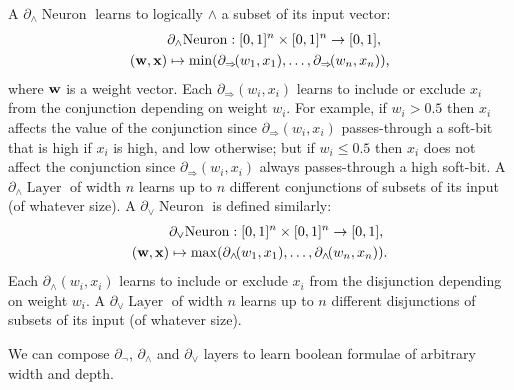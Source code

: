 \documentclass{article}
\theoremstyle{plain}
\theoremstyle{definition}
\theoremstyle{remark}
\begin{document}
A $\partial_{\wedge}\!\operatorname{Neuron}$ learns to logically $\wedge$ a subset of its input vector:
\begin{equation*}
\begin{aligned}
& \partial_{\wedge}\!\operatorname{Neuron}: [0,1]^{n} \times [0,1]^{n} \to [0,1], \\
({\bf w}, {\bf x}) & \mapsto \min(\partial_{\Rightarrow}\!(w_{1}, x_{1}), \dots, \partial_{\Rightarrow}\!(w_{n}, x_{n}))\text{,}
\end{aligned}
\end{equation*}
where ${\bf w}$ is a weight vector. Each $\partial_{\Rightarrow}(w_{i},x_{i})$ learns to include or exclude $x_{i}$ from the conjunction depending on weight $w_{i}$. For example, if $w_{i}>0.5$ then $x_{i}$ affects the value of the conjunction since $\partial_{\Rightarrow}(w_{i},x_{i})$ passes-through a soft-bit that is high if $x_{i}$ is high, and low otherwise; but if $w_{i} \leq 0.5$ then $x_{i}$ does not affect the conjunction since $\partial_{\Rightarrow}(w_{i},x_{i})$ always passes-through a high soft-bit. A $\partial_{\wedge}\!\operatorname{Layer}$ of width $n$ learns up to $n$ different conjunctions of subsets of its input (of whatever size). A $\partial_{\vee}\!\operatorname{Neuron}$ is defined similarly:
\begin{equation*}
\begin{aligned}
& \partial_{\vee}\!\operatorname{Neuron}: [0,1]^{n} \times [0,1]^{n} \to [0,1], \\
({\bf w}, {\bf x}) &\mapsto \max(\partial_{\wedge}\!(w_{1}, x_{1}), \dots, \partial_{\wedge}\!(w_{n}, x_{n}))\text{.}
\end{aligned}
\end{equation*}
Each $\partial_{\wedge}(w_{i},x_{i})$ learns to include or exclude $x_{i}$ from the disjunction depending on weight $w_{i}$. A $\partial_{\vee}\!\operatorname{Layer}$ of width $n$ learns up to $n$ different disjunctions of subsets of its input (of whatever size).

We can compose $\partial_{\neg}$, $\partial_{\wedge}$ and $\partial_{\vee}$ layers to learn boolean formulae of arbitrary width and depth.
\end{document}
